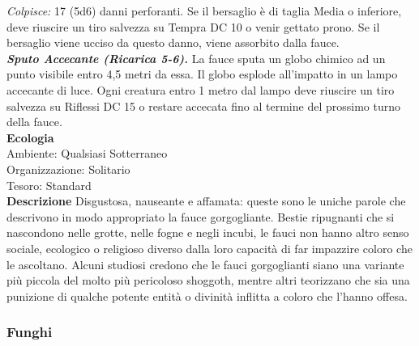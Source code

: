 \begin{multicols}{2}
\emph{Colpisce:} 17 (5d6) danni perforanti. Se il bersaglio è di taglia Media o inferiore, deve riuscire un tiro salvezza su Tempra DC 10 o venir gettato prono. Se il bersaglio viene ucciso da questo danno, viene assorbito dalla fauce.\\
\emph{\textbf{Sputo Accecante (Ricarica 5-6).}} La fauce sputa un globo chimico ad un punto visibile entro 4,5 metri da essa. Il globo esplode all'impatto in un lampo accecante di luce. Ogni creatura entro 1 metro dal lampo deve riuscire un tiro salvezza su Riflessi DC  15 o restare accecata fino al termine del prossimo turno della fauce.\\
\textbf{Ecologia}\\
Ambiente: Qualsiasi Sotterraneo\\
Organizzazione: Solitario\\
Tesoro: Standard\\
\textbf{Descrizione}
Disgustosa, nauseante e affamata: queste sono le uniche parole che descrivono in modo appropriato la fauce gorgogliante. Bestie ripugnanti che si nascondono nelle grotte, nelle fogne e negli incubi, le fauci non hanno altro senso sociale, ecologico o religioso diverso dalla loro capacità di far impazzire coloro che le ascoltano. Alcuni studiosi credono che le fauci gorgoglianti siano una variante più piccola del molto più pericoloso shoggoth, mentre altri teorizzano che sia una punizione di qualche potente entità o divinità inflitta a coloro che l’hanno offesa.\\


\subsubsection{Funghi}


\end{multicols}
